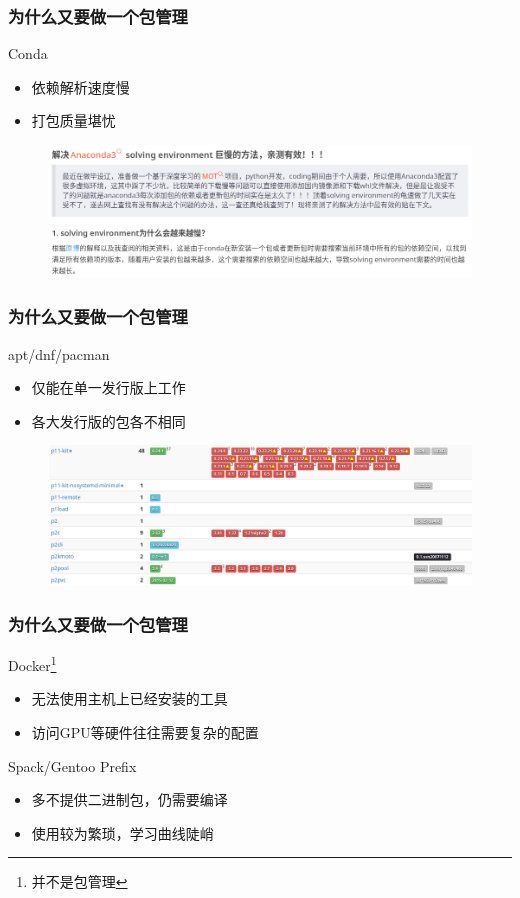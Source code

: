 \documentclass{ctexbeamer}
\begin{document}
\begin{frame}
  \frametitle{为什么又要做一个包管理}
  \begin{block}{Conda}
    \begin{itemize}
      \item 依赖解析速度慢
      \item 打包质量堪忧
    \end{itemize}
  \end{block}
  \begin{figure}
    \includegraphics[width=\linewidth]{./csdn-conda.png}
  \end{figure}
\end{frame}

\begin{frame}
  \frametitle{为什么又要做一个包管理}
  \begin{block}{apt/dnf/pacman}
    \begin{itemize}
      \item 仅能在单一发行版上工作
      \item 各大发行版的包各不相同
    \end{itemize}
  \end{block}
  \begin{figure}
    \includegraphics[width=\linewidth]{./repology.png}
  \end{figure}
\end{frame}

\begin{frame}
  \frametitle{为什么又要做一个包管理}
  \begin{block}{Docker\footnote{并不是包管理}}
    \begin{itemize}
      \item 无法使用主机上已经安装的工具
      \item 访问GPU等硬件往往需要复杂的配置
    \end{itemize}
  \end{block}
  \begin{block}{Spack/Gentoo Prefix}
    \begin{itemize}
      \item 多不提供二进制包，仍需要编译
      \item 使用较为繁琐，学习曲线陡峭
    \end{itemize}
  \end{block}
\end{frame}
\end{document}
